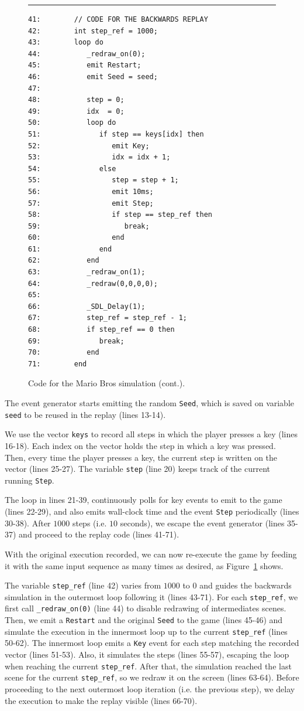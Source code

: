 \documentclass{sigplan-proc}
\newcommand{\2}{\;\;}
\newcommand{\5}{\;\;\;\;\;}
\newcommand{\code}[1] {{\small{\texttt{#1}}}}
\begin{document}
\begin{figure}[t]
\rule{8.5cm}{0.37pt}
{\small
\begin{verbatim}
41:        // CODE FOR THE BACKWARDS REPLAY
42:        int step_ref = 1000;
43:        loop do
44:           _redraw_on(0);
45:           emit Restart;
46:           emit Seed = seed;
47:
48:           step = 0;
49:           idx  = 0;
50:           loop do
51:              if step == keys[idx] then
52:                 emit Key;
53:                 idx = idx + 1;
54:              else
55:                 step = step + 1;
56:                 emit 10ms;
57:                 emit Step;
58:                 if step == step_ref then
59:                    break;
60:                 end
61:              end
62:           end
63:           _redraw_on(1);
64:           _redraw(0,0,0,0);
65:
66:           _SDL_Delay(1);
67:           step_ref = step_ref - 1;
68:           if step_ref == 0 then
69:              break;
70:           end
71:        end
\end{verbatim}
}
\caption{ Code for the Mario Bros simulation (cont.).
\label{lst:demos:mario:3}
}
\end{figure}

The event generator starts emitting the random \code{Seed}, which is saved on 
variable \code{seed} to be reused in the replay (lines 13-14).

We use the vector \code{keys} to record all steps in which the player presses a 
key (lines 16-18).
Each index on the vector holds the step in which a key was pressed.
Then, every time the player presses a key, the current step is written on the 
vector (lines 25-27).
The variable \code{step} (line 20) keeps track of the current running 
\code{Step}.

The loop in lines 21-39, continuously polls for key events to emit to the game 
(lines 22-29), and also emits wall-clock time and the event \code{Step} 
periodically (lines 30-38).
After $1000$ steps (i.e. $10$ seconds), we escape the event generator (lines 
35-37) and proceed to the replay code (lines 41-71).

With the original execution recorded, we can now re-execute the game by feeding 
it with the same input sequence as many times as desired, as 
Figure~\ref{lst:demos:mario:3} shows.

The variable \code{step\_ref} (line 42) varies from $1000$ to $0$ and guides 
the backwards simulation in the outermost loop following it (lines 43-71).
For each \code{step\_ref}, we first call \code{\_redraw\_on(0)} (line 44) to 
disable redrawing of intermediates scenes.
Then, we emit a \code{Restart} and the original \code{Seed} to the game (lines 
45-46) and simulate the execution in the innermost loop up to the current 
\code{step\_ref} (lines 50-62).
The innermost loop emits a \code{Key} event for each step matching the recorded 
vector (lines 51-53).
Also, it simulates the steps (lines 55-57), escaping the loop when reaching the 
current \code{step\_ref}.
After that, the simulation reached the last scene for the current 
\code{step\_ref}, so we redraw it on the screen (lines 63-64).
Before proceeding to the next outermost loop iteration (i.e. the previous 
step), we delay the execution to make the replay visible (lines 66-70).
\end{document}
